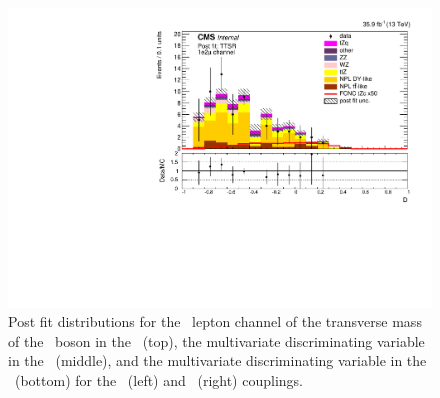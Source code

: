 \begin{figure}[htbp]
	\includegraphics[width=0.49\linewidth]{6_Search/Figures/ZctFit/New/shapes_fit_s_LepChan_1e2mu_TTSR_error_trial.pdf}
	\caption{Post fit distributions for the \emumu\ lepton channel of the transverse mass of the \PW\ boson in the \WZCR\ (top), the multivariate discriminating variable in the \STSR\ (middle), and the multivariate discriminating variable in the \TTSR\ (bottom) for the \Zut\ (left) and \Zct\ (right) couplings. }
	\label{fig:shapesfit1e2mu}
\end{figure}


